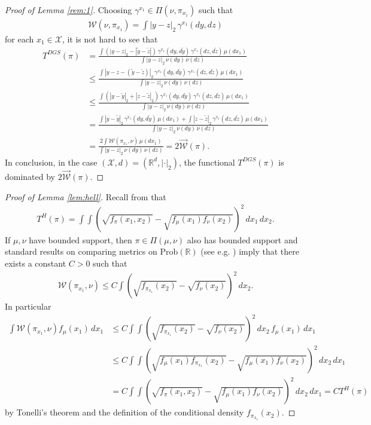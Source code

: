 \documentclass[10pt]{amsart}
\newcommand{\R}{\mathbb{R}}
\begin{document}
\begin{appendix}
\begin{proof}[Proof of Lemma \ref{rem:1}]
Choosing $\gamma^{x_1}\in \Pi(\nu,\pi_{x_1})$ such that
\begin{align*}
\mathcal{W}(\nu,\pi_{x_1}) =\int |y-z|_2\,\gamma^{x_1}(dy, dz)
\end{align*}
for each $x_1\in \mathcal{X}$,
it is not hard to see that
\begin{align*}
T^{DGS}(\pi)&= \frac{ \int (|y-z|_2 -|\tilde{y}-\tilde{z}|)\,\gamma^{x_1}(dy,d\tilde{y})\,\gamma^{x_1}(dz, d\tilde{z}) \,\mu(dx_1)}{\int |y-z|_2 \,\nu(dy)\,\nu(dz)}\\
&\le \frac{ \int |y -z-(\tilde{y}-\tilde{z})|_2\,\gamma^{x_1}(dy,d\tilde{y})\,\gamma^{x_1}(dz, d\tilde{z}) \,\mu(dx_1)}{\int |y-z|_2 \,\nu(dy)\,\nu(dz)}\\
&\le \frac{ \int (|y-\tilde{y}|_2+|z -\tilde{z}|_2)\,\gamma^{x_1}(dy,d\tilde{y})\,\gamma^{x_1}(dz, d\tilde{z}) \,\mu(dx_1)}{\int |y-z|_2 \,\nu(dy)\,\nu(dz)}\\
&= \frac{ \int |y-\tilde{y}|_2\,\gamma^{x_1}(dy,d\tilde{y})\,\mu(dx_1)+\int |z -\tilde{z}|_2\,\gamma^{x_1}(dz, d\tilde{z}) \,\mu(dx_1)}{\int |y-z|_2 \,\nu(dy)\,\nu(dz)}\\
&= \frac{2\int \mathcal{W}(\pi_{x_1},\nu)\,\mu(dx_1)}{\int |y-z|_2 \,\nu(dy)\,\nu(dz)}=2\overrightarrow{\mathcal{W}}(\pi).
\end{align*}
In conclusion, in the case $(\mathcal{X},d)=(\R^d, |\cdot|_2)$, the functional $T^{DGS}(\pi)$ is dominated by $2\overrightarrow{\mathcal{W}}(\pi)$.
\end{proof}

\begin{proof}[Proof of Lemma \ref{lem:hell}]
Recall from \cite[Section 4]{geenens2020hellinger} that
\begin{align*}
T^H(\pi)=\int \int \left( \sqrt{ f_\pi(x_1, x_2)}-\sqrt{ f_\mu(x_1) f_\nu(x_2)} \right)^2\,dx_1\,dx_2.
\end{align*}
If $\mu,\nu$ have bounded support, then $\pi\in \Pi(\mu,\nu)$ also has bounded support and standard results on comparing metrics on $\text{Prob}(\R)$ (see e.g. \cite{gibbs2002choosing}) imply that there exists a constant $C>0$ such that
\begin{align*}
\mathcal{W}(\pi_{x_1},\nu)\le C \int  \left( \sqrt{ f_{\pi_{x_1}}(x_2)}-\sqrt{ f_\nu(x_2)} \right)^2\,dx_2.
\end{align*}
In particular 
\begin{align*}
\int \mathcal{W}(\pi_{x_1},\nu)f_{\mu}(x_1)\,dx_1 &\le C \int \int  \left( \sqrt{ f_{\pi_{x_1}}(x_2)}-\sqrt{ f_\nu(x_2)} \right)^2\,dx_2 \, f_{\mu}(x_1)\,dx_1\\
&\le C \int \int  \left( \sqrt{ f_{\mu}(x_1) f_{\pi_{x_1}}(x_2)}-\sqrt{ f_{\mu}(x_1) f_\nu(x_2)} \right)^2\,dx_2 \,dx_1\\
&=C \int \int  \left( \sqrt{ f_{\pi}(x_1,x_2)}-\sqrt{ f_{\mu}(x_1) f_\nu(x_2)} \right)^2\,dx_2 \,dx_1=CT^H(\pi)
\end{align*}
by Tonelli's theorem and the definition of the conditional density $ f_{\pi_{x_1}}(x_2)$.
\end{proof}


\end{appendix}
\end{document}
